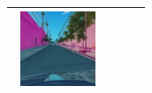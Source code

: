 \documentclass{VUMIFPSbakalaurinis}
\begin{document}
\begin{table}[H]
{\begin{tabular}{|c|c|c|c|}
            \includegraphics[width=100,height=85]{img/diffusion/instruct/7cf55c3d-9cbeb7c6} \\
            \hline
            \end{tabular}
        }
        \label{tab:table example}
    \end{table}
\end{document}
